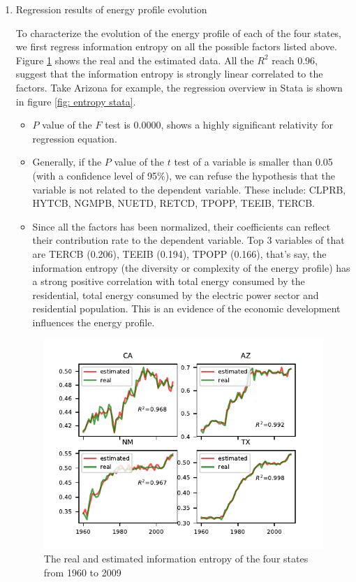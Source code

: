 \begin{enumerate}
\item{Regression results of energy profile evolution} \par
To characterize the evolution of the energy profile of each of the four states, we first regress information entropy on all the possible factors listed above. Figure \ref{fig: entropy regress} shows the real and the estimated data. All the $R^2$ reach 0.96, suggest that the information entropy is strongly linear correlated to the factors. Take Arizona for example, the regression overview in Stata is shown in figure \ref{fig: entropy stata}.
\begin{itemize}
    \item $P$ value of the $F$ test is 0.0000, shows a highly significant relativity for regression equation.
    \item Generally, if the $P$ value of the $t$ test of a variable is smaller than 0.05 (with a confidence level of 95\%), we can refuse the hypothesis that the variable is not related to the dependent variable. These include: CLPRB, HYTCB, NGMPB, NUETD, RETCD, TPOPP, TEEIB, TERCB. 
    \item Since all the factors has been normalized, their coefficients can reflect their contribution rate to the dependent variable. Top 3 variables of that are TERCB (0.206), TEEIB (0.194), TPOPP (0.166), that's say, the information entropy (the diversity or complexity of the energy profile) has a strong positive correlation with total energy consumed by the residential, total energy consumed by the electric power sector and residential population. This is an evidence of the economic development influences the energy profile. 
\end{itemize}
\begin{figure}[H] 
    \centering 
    \includegraphics[width=0.6\linewidth]{fig/entropy_estimation.pdf}
    \caption{The real and estimated information entropy of the four states from 1960 to 2009}
    \label{fig: entropy regress}
\end{figure}


\end{enumerate}
